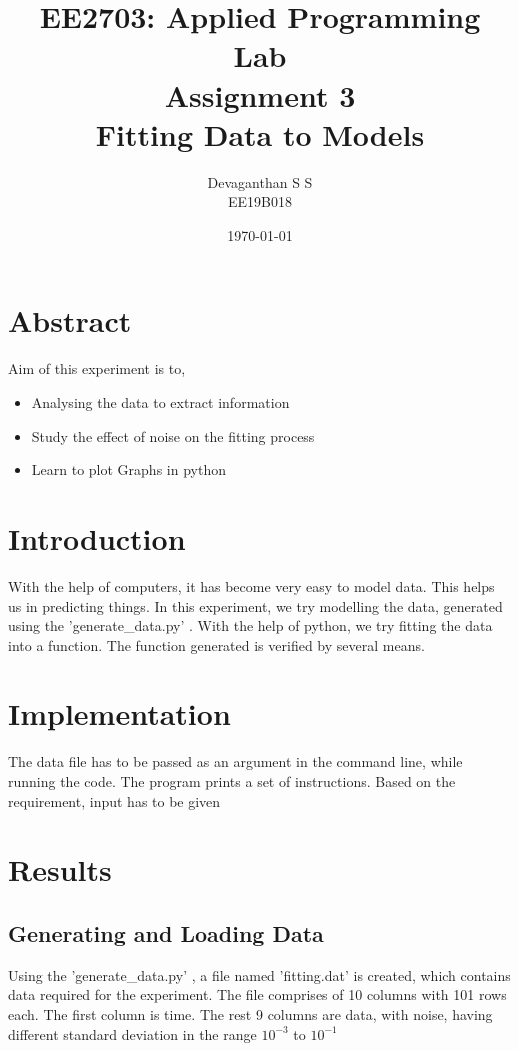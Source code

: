 \documentclass[12pt, a4paper]{report}
\title{\textbf{EE2703: Applied Programming Lab\\Assignment 3\\Fitting Data to Models}}
\author{Devaganthan S S\\ EE19B018}
\date{\today}
\begin{document}
\maketitle


\section{Abstract}
Aim of this experiment is to,
\begin{itemize}
    \item Analysing the data to extract information
    \item Study the effect of noise on the fitting process
    \item Learn to plot Graphs in python
\end{itemize}

\section{Introduction}
With the help of computers, it has become very easy to model data. This helps us in predicting things.
In this experiment, we try modelling the data, generated using the {\selectfont
'generate\_data.py'
}. With the help of python, we try fitting the data into a function. The function generated is verified by several means.

\section{Implementation}
The data file has to be passed as an argument in the command line, while running the code. The program prints a set of instructions. Based on the requirement, input has to be given

\section{Results}
\subsection{Generating and Loading Data}
Using the {\selectfont
'generate\_data.py'
}, a file named {\selectfont
'fitting.dat'
} is created, which contains data required for the experiment. The file comprises of 10 columns with 101 rows each. The first column is time. The rest 9 columns are data, with noise, having different standard deviation in the range $10^{-3}$  to $10^{-1}$
\end{document}
